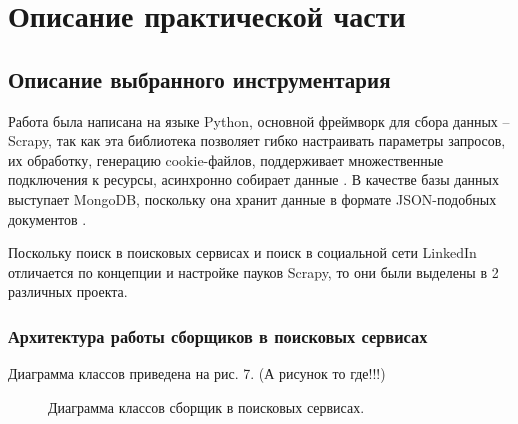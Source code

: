 \section{Описание практической части}
\label{sec:Chapter4} 
\subsection{Описание выбранного инструментария}
Работа была написана на языке Python, основной фреймворк для сбора данных -- Scrapy, так как эта библиотека позволяет
гибко настраивать параметры запросов, их обработку, генерацию cookie-файлов, поддерживает множественные подключения к ресурсы, 
асинхронно собирает данные \cite{scrapyBook}. В качестве базы данных
выступает MongoDB, поскольку она хранит данные в формате JSON-подобных документов \cite{mongoDBBook}. 

\par
Поскольку поиск в поисковых сервисах и поиск в социальной сети LinkedIn отличается по концепции и настройке пауков Scrapy, то
они были выделены в 2 различных проекта.

\subsubsection{Архитектура работы сборщиков в поисковых сервисах}
\par
Диаграмма классов приведена на рис. 7. (А рисунок то где!!!)

\begin{figure}[H]
    \caption{Диаграмма классов сборщик в поисковых сервисах.}
    \label{ris:image}
\end{figure}

